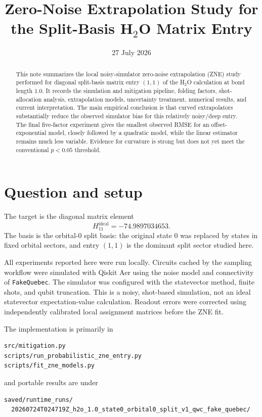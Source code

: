 \documentclass[11pt]{article}
\title{Zero-Noise Extrapolation Study for the Split-Basis H$_2$O Matrix Entry}
\author{}
\date{27 July 2026}
\begin{document}
\maketitle

\begin{abstract}
This note summarizes the local noisy-simulator zero-noise extrapolation (ZNE)
study performed for diagonal split-basis matrix entry $(1,1)$ of the H$_2$O
calculation at bond length $1.0$.  It records the simulation and mitigation
pipeline, folding factors, shot-allocation analysis, extrapolation models,
uncertainty treatment, numerical results, and current interpretation.  The
main empirical conclusion is that curved extrapolators substantially reduce
the observed simulator bias for this relatively noisy/deep entry.  The final
five-factor experiment gives the smallest observed RMSE for an
offset-exponential model, closely followed by a quadratic model, while the
linear estimator remains much less variable.  Evidence for curvature is
strong but does not yet meet the conventional $p<0.05$ threshold.
\end{abstract}

\section{Question and setup}

The target is the diagonal matrix element
\[
  H_{11}^{\mathrm{ideal}}=-74.9897034653.
\]
The basis is the orbital-$0$ split basis: the original state $0$ was replaced
by states in fixed orbital sectors, and entry $(1,1)$ is the dominant split
sector studied here.

All experiments reported here were run locally.  Circuits cached by the
sampling workflow were simulated with Qiskit Aer using the noise model and
connectivity of \texttt{FakeQuebec}.  The simulator was configured with the
statevector method, finite shots, and qubit truncation.  This is a noisy,
shot-based simulation, not an ideal statevector expectation-value
calculation.  Readout errors were corrected using independently calibrated
local assignment matrices before the ZNE fit.

The implementation is primarily in
\begin{verbatim}
src/mitigation.py
scripts/run_probabilistic_zne_entry.py
scripts/fit_zne_models.py
\end{verbatim}
and portable results are under
\begin{verbatim}
saved/runtime_runs/
  20260724T024719Z_h2o_1.0_state0_orbital0_split_v1_qwc_fake_quebec/
\end{verbatim}
\end{document}
